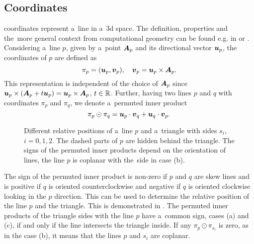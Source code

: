 \subsection{\plucker Coordinates}
\plucker coordinates represent a~line in a~3d space. The definition, properties and the~more general context from computational 
geometry can be found e.g. in \cite{dorst_geometric_2007} or \cite{joswig_plucker_2013}.
Considering a~line $p$, given by a~point $\mathbf{\boldsymbol{A}}_p$ and its directional vector $\mathbf{\boldsymbol{u}}_p$, 
the \plucker coordinates of $p$ are defined as
\begin{equation} \label{eqn:plucker_coordinates}
    \pi_p = (\mathbf{\boldsymbol{u}}_p, \mathbf{\boldsymbol{v}}_p), \quad \mathbf{\boldsymbol{v}}_p = \mathbf{\boldsymbol{u}}_p\times \mathbf{\boldsymbol{A}}_p.
\end{equation}
This representation is independent of the choice of $\mathbf{\boldsymbol{A}}_p$ since $\mathbf{\boldsymbol{u}}_p\times (\mathbf{\boldsymbol{A}}_p + t \mathbf{\boldsymbol{u}}_p) = \mathbf{\boldsymbol{u}}_p\times \mathbf{\boldsymbol{A}}_p$,
$t\in{\mathbb{R}}$. Further, having two lines $p$ and $q$ with \plucker coordinates $\pi_p$ and $\pi_q$, we denote a~permuted inner product
\begin{equation} \label{eqn:plucker_product}
    \pi_p \odot \pi_q = \mathbf{\boldsymbol{u}}_p\cdot \mathbf{\boldsymbol{v}}_q + \mathbf{\boldsymbol{u}}_q \cdot \mathbf{\boldsymbol{v}}_p.
\end{equation}    

\begin{figure}[!htb]
    \centering
    \hspace{2ex}
    \hspace{2ex}
    \caption[Geometric illustration of \plucker products.]
    {Different relative positions of a~line $p$ and a~triangle with sides $s_i$, $i=0,1,2$. 
        The dashed parts of $p$ are hidden behind the triangle. The signs of the permuted inner products depend on the orientation of lines,
        the line $p$ is coplanar with the~side in case (b).}
    \label{fig:plucker_products}
\end{figure}
%
The sign of the permuted inner product is non-zero if $p$ and $q$ are skew lines and is positive if $q$ is oriented counterclockwise and 
negative if $q$ is oriented clockwise looking in the $p$ direction. This can be used to determine the relative position 
of the line $p$ and the triangle. This is demonstrated in .
The permuted inner products of the triangle sides with the line $p$ have a~common sign, cases (a) and (c), if and only if the 
line intersects the triangle inside. If any $\pi_p\odot \pi_{s_i}$ is zero, as in the case (b), 
it means that the lines $p$ and $s_i$ are coplanar.



